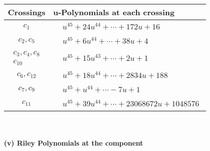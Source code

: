 \documentclass[1p]{elsarticle_modified}
\theoremstyle{definition}
\begin{document}
\begin{tabular}{m{50pt}|m{274pt}}
Crossings & \hspace{64pt}u-Polynomials at each crossing \\
\hline $$\begin{aligned}c_{1}\end{aligned}$$&$\begin{aligned}
&u^{45}+24 u^{44}+\cdots+172 u+16
\end{aligned}$\\
\hline $$\begin{aligned}c_{2},c_{5}\end{aligned}$$&$\begin{aligned}
&u^{45}+6 u^{44}+\cdots+38 u+4
\end{aligned}$\\
\hline $$\begin{aligned}c_{3},c_{4},c_{8}\\c_{10}\end{aligned}$$&$\begin{aligned}
&u^{45}+15 u^{43}+\cdots+2 u+1
\end{aligned}$\\
\hline $$\begin{aligned}c_{6},c_{12}\end{aligned}$$&$\begin{aligned}
&u^{45}+18 u^{44}+\cdots+2834 u+188
\end{aligned}$\\
\hline $$\begin{aligned}c_{7},c_{9}\end{aligned}$$&$\begin{aligned}
&u^{45}+u^{44}+\cdots-7 u+1
\end{aligned}$\\
\hline $$\begin{aligned}c_{11}\end{aligned}$$&$\begin{aligned}
&u^{45}+39 u^{44}+\cdots+23068672 u+1048576
\end{aligned}$\\
\hline
\end{tabular}\\~\\
\newpage\renewcommand{\arraystretch}{1}
\flushleft \textbf{(v) Riley Polynomials at the component}\newline \\
\end{document}
